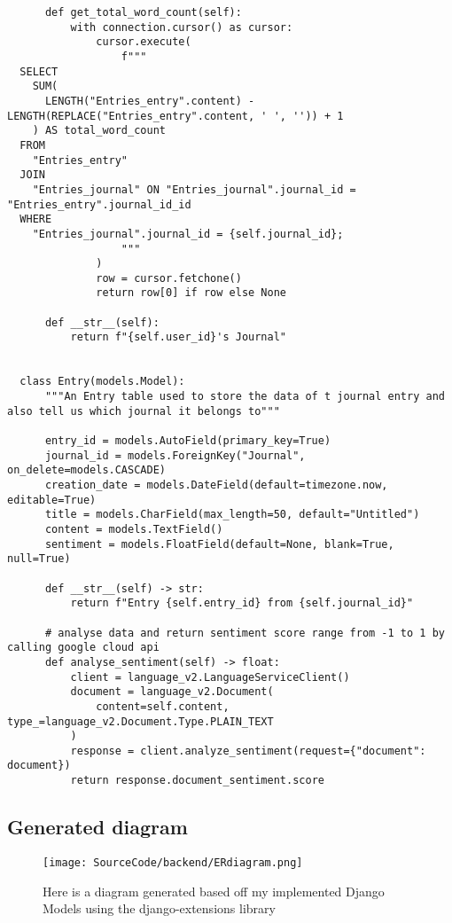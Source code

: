 \begin{verbatim}
      def get_total_word_count(self):
          with connection.cursor() as cursor:
              cursor.execute(
                  f"""
  SELECT
    SUM(
      LENGTH("Entries_entry".content) - LENGTH(REPLACE("Entries_entry".content, ' ', '')) + 1
    ) AS total_word_count
  FROM
    "Entries_entry"
  JOIN
    "Entries_journal" ON "Entries_journal".journal_id = "Entries_entry".journal_id_id
  WHERE
    "Entries_journal".journal_id = {self.journal_id};
                  """
              )
              row = cursor.fetchone()
              return row[0] if row else None
  
      def __str__(self):
          return f"{self.user_id}'s Journal"
  
  
  class Entry(models.Model):
      """An Entry table used to store the data of t journal entry and also tell us which journal it belongs to"""
  
      entry_id = models.AutoField(primary_key=True)
      journal_id = models.ForeignKey("Journal", on_delete=models.CASCADE)
      creation_date = models.DateField(default=timezone.now, editable=True)
      title = models.CharField(max_length=50, default="Untitled")
      content = models.TextField()
      sentiment = models.FloatField(default=None, blank=True, null=True)
  
      def __str__(self) -> str:
          return f"Entry {self.entry_id} from {self.journal_id}"
  
      # analyse data and return sentiment score range from -1 to 1 by calling google cloud api
      def analyse_sentiment(self) -> float:
          client = language_v2.LanguageServiceClient()
          document = language_v2.Document(
              content=self.content, type_=language_v2.Document.Type.PLAIN_TEXT
          )
          response = client.analyze_sentiment(request={"document": document})
          return response.document_sentiment.score
\end{verbatim}

\subsection{Generated diagram}

\begin{figure}[H]
  \centering
  \texttt{[image: SourceCode/backend/ERdiagram.png]}
  \caption{Here is a diagram generated based off my implemented Django Models using the django-extensions library}
  \label{fig:ERdiagram}
\end{figure}


